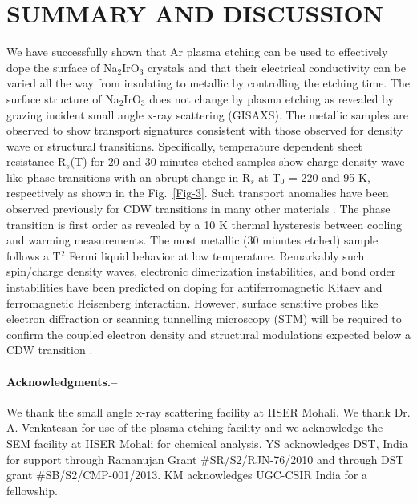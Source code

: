 \documentclass[aps,prb,twocolumn]{revtex4-1}
\begin{document}
\section{SUMMARY AND DISCUSSION}
We have successfully shown that Ar plasma etching can be used to effectively dope the surface of Na$_{2}$IrO$_{3}$ crystals and that their electrical conductivity can be varied all the way from insulating to metallic by controlling the etching time. The surface structure of Na$_{2}$IrO$ _{3} $ does not change by plasma etching as revealed by grazing incident small angle x-ray scattering (GISAXS). The metallic samples are observed to show transport signatures consistent with those observed for density wave or structural transitions. Specifically, temperature dependent sheet resistance R$ _{s} $(T) for 20 and 30 minutes etched samples show charge density wave like phase transitions with an abrupt change in R$ _{s} $ at T$ _{0} $ = 220 and 95 K, respectively as shown in the Fig.~\ref{Fig-3}.  Such transport anomalies have been observed previously for CDW transitions in many other materials \cite{Yang1991, Singh2005, Singh2005a}.  The phase transition is first order as revealed by a 10 K thermal hysteresis between cooling and warming measurements. The most metallic (30 minutes etched) sample follows a T$^{2}$ Fermi liquid behavior at low temperature. Remarkably such spin/charge density waves, electronic dimerization instabilities, and bond order instabilities have been predicted on doping for antiferromagnetic Kitaev and ferromagnetic Heisenberg interaction\cite{You2012, Okamoto2013, Scherer2014}.  However, surface sensitive probes like electron diffraction or scanning tunnelling microscopy (STM) will be required to confirm the coupled electron density and structural modulations expected below a CDW transition \cite{Gruener2000}.  

\paragraph{Acknowledgments.--} We thank the small angle x-ray scattering facility at IISER Mohali. We thank Dr. A. Venkatesan for use of the plasma etching facility and we acknowledge the SEM facility at IISER Mohali for chemical analysis.  YS acknowledges DST, India for support through Ramanujan Grant \#SR/S2/RJN-76/2010 and through DST grant \#SB/S2/CMP-001/2013. KM acknowledges UGC-CSIR India for a fellowship.
\end{document}
